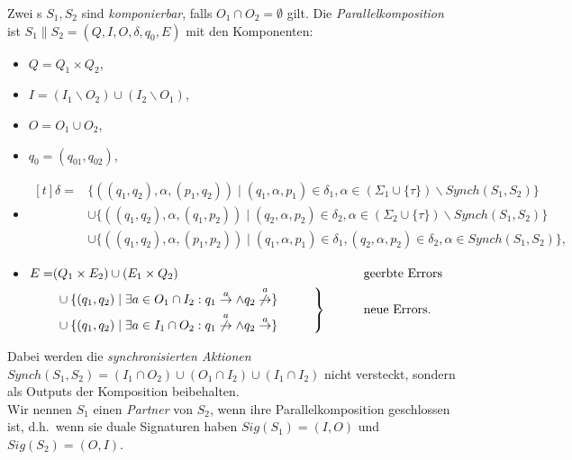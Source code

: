 \begin{Def}[Parallelkomposition]
  Zwei \EIO{}s $S_1, S_2$ sind \emph{komponierbar}, falls
  $O_1\cap O_2=\emptyset$ gilt. Die \emph{Parallelkomposition} ist
  $S_1\|S_2=(Q,I,O,\delta ,q_0,E)$ mit den Komponenten:
  \begin{itemize}
    \item $Q=Q_1\times Q_2$,
    \item $I=(I_1\backslash O_2)\cup(I_2\backslash O_1)$,
    \item $O=O_1\cup O_2$,
    \item $q_0=(q_{01},q_{02})$,
    \item $\begin{aligned}[t]
    \delta =&\{((q_1,q_2),\alpha ,(p_1,q_2))\mid (q_1,\alpha ,p_1)\in\delta
      _1,\alpha\in(\Sigma _1\cup\{\tau\})\backslash Synch(S_1,S_2)\}\\
      &\cup\{((q_1,q_2),\alpha ,(q_1,p_2))\mid (q_2,\alpha ,p_2)\in\delta
      _2,\alpha\in(\Sigma _2\cup\{\tau\})\backslash Synch(S_1,S_2)\}\\
      &\cup\{((q_1,q_2),\alpha ,(p_1,p_2))\mid (q_1,\alpha ,p_1)\in\delta
      _1, (q_2,\alpha ,p_2)\in\delta _2, \alpha\in Synch(S_1,S_2)\},
  \end{aligned}$
    \item $\begin{aligned}[t]
        E=&(Q_1\times E_2)\cup (E_1\times Q_2)
        &&\phantom{neue}\mathrm{geerbte}~\mathrm{Errors}\\
        &\left.\begin{aligned}
        &\cup\{(q_1,q_2)\mid \exists a\in O_1\cap I_2: q_1\overset{a}{\rightarrow}\wedge
      q_2\overset{a}{\not{\hspace{-0.1cm}\rightarrow}}\}\\
      &\cup\{(q_1,q_2)\mid \exists a\in I_1\cap O_2:
q_1\overset{a}{\not{\hspace{-0.1cm}\rightarrow}}\wedge
q_2\overset{a}{\rightarrow}\}
\end{aligned}\hspace{1cm}\right\}
      &&\phantom{neue}\mathrm{neue}~\mathrm{Errors}.\\
  \end{aligned}$
  \end{itemize}
  Dabei werden die \emph{synchronisierten Aktionen} $Synch(S_1,
  S_2)=(I_1\cap O_2)\cup(O_1\cap I_2)\cup (I_1\cap I_2)$ nicht versteckt,
  sondern als Outputs der Komposition beibehalten.\\
  Wir nennen $S_1$ einen \emph{Partner} von $S_2$, wenn ihre
  Parallelkomposition geschlossen ist, d.h.\ wenn sie duale Signaturen haben
  $Sig(S_1)=(I,O)$ und $Sig(S_2)=(O,I)$.
\end{Def}

